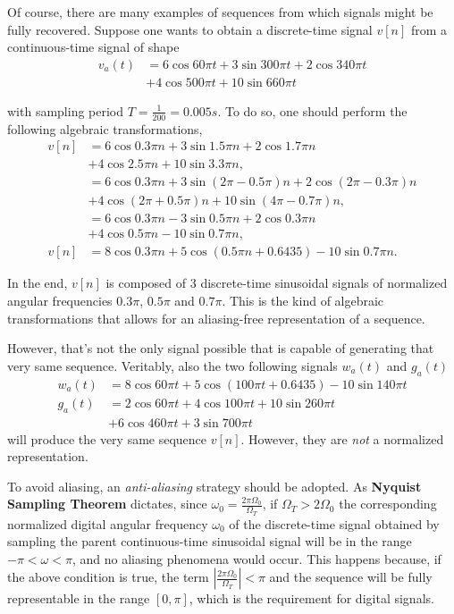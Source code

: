 \documentclass[\documentfontsize, twocolumn]{\classname}
\begin{document}
Of course, there are many examples of se\-quen\-ces from which signals might be fully recovered. Suppose one wants to obtain a discrete-time signal $v[n]$ from a con\-ti\-nuo\-us-time signal of shape
\begin{align*}
v_a(t) &=6\cos{60\pi t} + 3\sin{300\pi t} + 2\cos{340\pi t} \\ & + 4\cos{500\pi t} + 10\sin{660\pi t}
\end{align*}

with sampling period $T = \frac 1 {200} = 0.005s$.
To do so, one should perform the following algebraic transformations,
\begin{align*}
    v[n] &= 6 \cos{0.3 \pi n} + 3 \sin{1.5 \pi n} + 2 \cos{1.7 \pi n} \\
         &+ 4 \cos{2.5 \pi n} + 10 \sin{3.3 \pi n},\\
         &= 6 \cos{0.3 \pi n} + 3 \sin{(2\pi -0.5 \pi) n} + 2 \cos{(2\pi - 0.3\pi)n} \\
         &+ 4 \cos{(2 \pi + 0.5\pi) n} + 10 \sin{(4 \pi - 0.7\pi) n},\\
         &= 6 \cos{0.3 \pi n} - 3 \sin{0.5 \pi n} + 2 \cos{0.3\pi n} \\
         &+ 4 \cos{0.5\pi n} - 10 \sin{0.7\pi n},\\
    v[n] &= 8 \cos{0.3 \pi n} + 5 \cos{(0.5 \pi n + 0.6435)} - 10 \sin{0.7\pi n}.
\end{align*}

In the end, $v[n]$ is composed of 3 discrete-time sinusoidal signals of normalized angular frequencies $0.3\pi$, $0.5\pi$ and $0.7\pi$. This is the kind of algebraic transformations that allows for an aliasing-free representation of a sequence.

However, that's not the only signal possible that is capable of generating that very same sequence. Veritably, also the two following signals $w_a(t)$ and $g_a(t)$
\begin{align*}
    w_a(t) &= 8 \cos{60 \pi t} + 5\cos{(100 \pi t + 0.6435)} - 10\sin {140\pi t}\\
    g_a(t) &= 2 \cos{60 \pi t} + 4\cos{100 \pi t} + 10\sin {260\pi t}\\
           &+ 6\cos{460\pi t} + 3 \sin{700\pi t}
\end{align*}
will produce the very same sequence $v[n]$.
However, they are \emph{not} a normalized representation.

To avoid aliasing, an \emph{anti-aliasing} strategy should be adopted. As \textbf{Nyquist Sampling Theorem} dictates, since $\omega_0 = \frac{2\pi \Omega_0}{\Omega_T}$, if $\Omega_T > 2\Omega_0$ the corresponding normalized digital angular frequency $\omega_0$ of the discrete-time signal obtained by sampling the parent continuous-time sinusoidal signal will be in the range $-\pi < \omega < \pi$, and no aliasing phenomena would occur.
This happens because, if the above condition is true, the term $\left|\frac{2\pi \Omega_0}{\Omega_T}\right| < \pi$ and the sequence will be fully representable in the range $[0, \pi]$, which is the requirement for digital signals.
\end{document}
